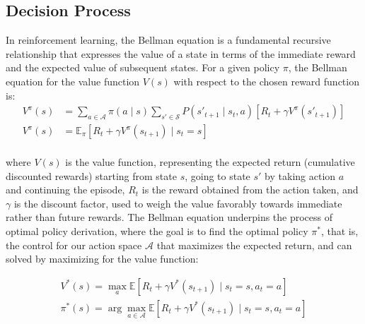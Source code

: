 \subsection{Decision Process}
\label{subsec:decision-process}

In reinforcement learning, the Bellman equation is a fundamental recursive relationship that expresses the value of a
state in terms of the immediate reward and the expected value of subsequent states.
For a given policy $\pi$, the Bellman equation for the value function $V(s)$ with respect to the chosen reward function is:
\begin{equation*}
    \begin{aligned}
        V^\pi(s) &= \sum_{a \in \mathcal{A}} \pi(a \mid s) \sum_{s' \in \mathcal{S}} P(s'_{t+1} \mid s_{t}, a) \left[ R_t + \gamma V^\pi(s'_{t+1}) \right]\\
        V^\pi(s) &= \mathbb{E}_\pi \left[ R_t + \gamma V^\pi(s_{t+1}) \mid s_t = s \right]\\
    \end{aligned}
\end{equation*}

where $V(s)$ is the value function, representing the expected return (cumulative discounted rewards) starting from state $s$,
going to state $s'$ by taking action $a$ and continuing the episode, $R_t$ is the reward obtained from the action taken,
and $\gamma$ is the discount factor, used to weigh the value favorably towards immediate rather than future rewards.
The Bellman equation underpins the process of optimal policy derivation, where the goal is to find the optimal policy $\pi^*$,
that is, the control for our action space $\mathcal{A}$ that maximizes the expected return,
and can solved by maximizing for the value function:

\begin{gather*}
    V^*(s) = \max_a \mathbb{E} \left[ R_t + \gamma V^*(s_{t+1}) \mid s_t = s, a_t = a \right]\\
    \pi^*(s) = \arg \max_{a \in \mathcal{A}} \mathbb{E} \left[ R_t + \gamma V^*(s_{t+1}) \mid s_t = s, a_t = a \right]\\
\end{gather*}


